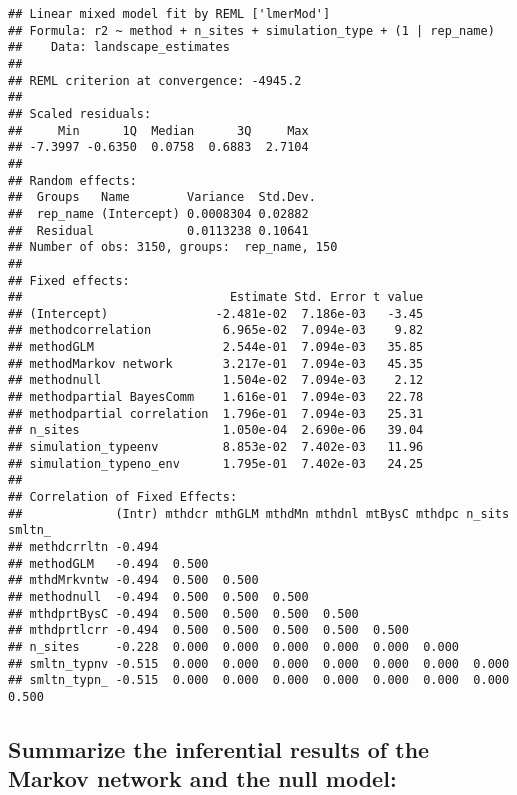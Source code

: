 \documentclass[11pt,]{article}
\begin{document}
\begin{verbatim}
## Linear mixed model fit by REML ['lmerMod']
## Formula: r2 ~ method + n_sites + simulation_type + (1 | rep_name)
##    Data: landscape_estimates
## 
## REML criterion at convergence: -4945.2
## 
## Scaled residuals: 
##     Min      1Q  Median      3Q     Max 
## -7.3997 -0.6350  0.0758  0.6883  2.7104 
## 
## Random effects:
##  Groups   Name        Variance  Std.Dev.
##  rep_name (Intercept) 0.0008304 0.02882 
##  Residual             0.0113238 0.10641 
## Number of obs: 3150, groups:  rep_name, 150
## 
## Fixed effects:
##                             Estimate Std. Error t value
## (Intercept)               -2.481e-02  7.186e-03   -3.45
## methodcorrelation          6.965e-02  7.094e-03    9.82
## methodGLM                  2.544e-01  7.094e-03   35.85
## methodMarkov network       3.217e-01  7.094e-03   45.35
## methodnull                 1.504e-02  7.094e-03    2.12
## methodpartial BayesComm    1.616e-01  7.094e-03   22.78
## methodpartial correlation  1.796e-01  7.094e-03   25.31
## n_sites                    1.050e-04  2.690e-06   39.04
## simulation_typeenv         8.853e-02  7.402e-03   11.96
## simulation_typeno_env      1.795e-01  7.402e-03   24.25
## 
## Correlation of Fixed Effects:
##             (Intr) mthdcr mthGLM mthdMn mthdnl mtBysC mthdpc n_sits smltn_
## methdcrrltn -0.494                                                        
## methodGLM   -0.494  0.500                                                 
## mthdMrkvntw -0.494  0.500  0.500                                          
## methodnull  -0.494  0.500  0.500  0.500                                   
## mthdprtBysC -0.494  0.500  0.500  0.500  0.500                            
## mthdprtlcrr -0.494  0.500  0.500  0.500  0.500  0.500                     
## n_sites     -0.228  0.000  0.000  0.000  0.000  0.000  0.000              
## smltn_typnv -0.515  0.000  0.000  0.000  0.000  0.000  0.000  0.000       
## smltn_typn_ -0.515  0.000  0.000  0.000  0.000  0.000  0.000  0.000  0.500
\end{verbatim}

\subsection{Summarize the inferential results of the Markov network and
the null
model:}\label{summarize-the-inferential-results-of-the-markov-network-and-the-null-model}
\end{document}
